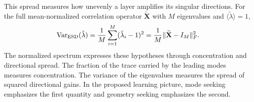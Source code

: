 This spread measures how unevenly a layer amplifies its singular
directions. For the full
mean-normalized correlation operator $\widetilde{\mathbf X}$
with $M$ eigenvalues and $\langle\tilde\lambda\rangle=1$,
\[
 \operatorname{Var}_{\rm ESD}(\tilde\lambda)
   =\frac{1}{M}\sum_{i=1}^M(\tilde\lambda_i-1)^2
   =\frac{1}{M}\|\widetilde{\mathbf X}-I_M\|_F^2 .
\]
The normalized spectrum expresses these hypotheses through
concentration and directional spread. The fraction of the trace
carried by the leading modes measures concentration. The variance
of the eigenvalues measures the spread of squared directional
gains. In the proposed learning picture, mode seeking emphasizes
the first quantity and geometry seeking emphasizes the second.
\clearpage
